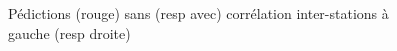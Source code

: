 \documentclass[xcolor=svgnames, t]{beamer}
\begin{document}
\begin{frame}{\subsecname}
\begin{figure}
    \caption{Pédictions (rouge) sans (resp avec) corrélation inter-stations à gauche (resp droite)}
  \end{figure}
\end{frame}
\end{document}
